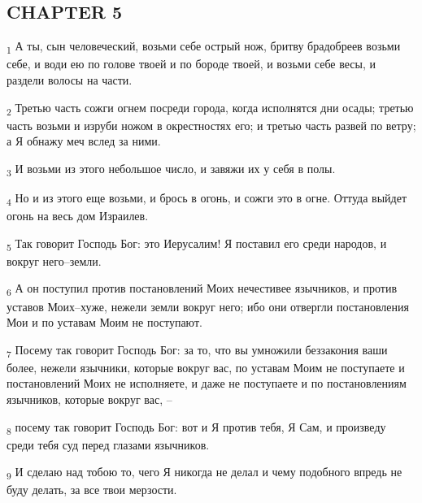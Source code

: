 \subsection{CHAPTER 5}
\begin{tcolorbox}
\textsubscript{1} А ты, сын человеческий, возьми себе острый нож, бритву брадобреев возьми себе, и води ею по голове твоей и по бороде твоей, и возьми себе весы, и раздели волосы на части.
\end{tcolorbox}
\begin{tcolorbox}
\textsubscript{2} Третью часть сожги огнем посреди города, когда исполнятся дни осады; третью часть возьми и изруби ножом в окрестностях его; и третью часть развей по ветру; а Я обнажу меч вслед за ними.
\end{tcolorbox}
\begin{tcolorbox}
\textsubscript{3} И возьми из этого небольшое число, и завяжи их у себя в полы.
\end{tcolorbox}
\begin{tcolorbox}
\textsubscript{4} Но и из этого еще возьми, и брось в огонь, и сожги это в огне. Оттуда выйдет огонь на весь дом Израилев.
\end{tcolorbox}
\begin{tcolorbox}
\textsubscript{5} Так говорит Господь Бог: это Иерусалим! Я поставил его среди народов, и вокруг него--земли.
\end{tcolorbox}
\begin{tcolorbox}
\textsubscript{6} А он поступил против постановлений Моих нечестивее язычников, и против уставов Моих--хуже, нежели земли вокруг него; ибо они отвергли постановления Мои и по уставам Моим не поступают.
\end{tcolorbox}
\begin{tcolorbox}
\textsubscript{7} Посему так говорит Господь Бог: за то, что вы умножили беззакония ваши более, нежели язычники, которые вокруг вас, по уставам Моим не поступаете и постановлений Моих не исполняете, и даже не поступаете и по постановлениям язычников, которые вокруг вас, --
\end{tcolorbox}
\begin{tcolorbox}
\textsubscript{8} посему так говорит Господь Бог: вот и Я против тебя, Я Сам, и произведу среди тебя суд перед глазами язычников.
\end{tcolorbox}
\begin{tcolorbox}
\textsubscript{9} И сделаю над тобою то, чего Я никогда не делал и чему подобного впредь не буду делать, за все твои мерзости.
\end{tcolorbox}
